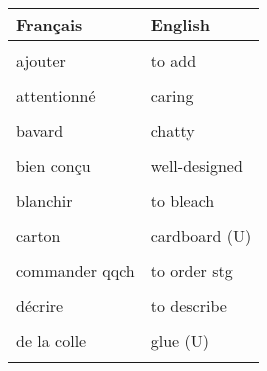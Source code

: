 \documentclass[
  10pt,
]{article}
\begin{document}
\begin{longtable}{ll}
\toprule
Français & \vphantom{1}English\\

\midrule
\cellcolor{gray!6}{aimer faire qqch} & \cellcolor{gray!6}{to like doing stg}\\

ajouter & to add\\

\cellcolor{gray!6}{assister à une réunion} & \cellcolor{gray!6}{to attend a meeting}\\

attentionné & caring\\

\cellcolor{gray!6}{avoir peur de qqch} & \cellcolor{gray!6}{to be afraid of stg}\\

bavard & chatty\\

\cellcolor{gray!6}{bien aimer faire qqch} & \cellcolor{gray!6}{to enjoy doing stg}\\

bien conçu & well-designed\\

\cellcolor{gray!6}{bien s'adapter} & \cellcolor{gray!6}{to fit}\\

blanchir & to bleach\\

\cellcolor{gray!6}{brillant} & \cellcolor{gray!6}{glossy}\\

carton & cardboard (U)\\

\cellcolor{gray!6}{choisir} & \cellcolor{gray!6}{to choose}\\

commander qqch & to order stg\\

\cellcolor{gray!6}{d'apparence professionnelle} & \cellcolor{gray!6}{professional-looking}\\

décrire & to describe\\

\cellcolor{gray!6}{de la cire} & \cellcolor{gray!6}{wax (U)}\\

de la colle & glue (U)\\

\cellcolor{gray!6}{délavé} & \cellcolor{gray!6}{washed out}\\


\end{longtable}
\end{document}
